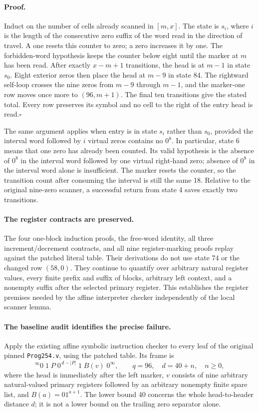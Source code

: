 \paragraph{Proof.}
Induct on the number of cells already scanned in $[m,x]$.  The state is
$s_i$, where $i$ is the length of the consecutive zero suffix of the
word read in the direction of travel.  A one resets this counter to
zero; a zero increases it by one.  The forbidden-word hypothesis keeps
the counter below eight until the marker at $m$ has been read.  After
exactly $x-m+1$ transitions, the head is at $m-1$ in state $s_0$.
Eight exterior zeros then place the head at $m-9$ in state 84.  The
rightward self-loop crosses the nine zeros from $m-9$ through $m-1$,
and the marker-one row moves once more to $(96,m+1)$.  The final ten
transitions give the stated total.  Every row preserves its symbol and
no cell to the right of the entry head is read.\hfill$\square$

The same argument applies when entry is in state $s_i$ rather than
$s_0$, provided the interval word followed by $i$ virtual zeros contains
no $0^8$.  In particular, state 6 means that one zero has already been
counted.  Its valid hypothesis is the absence of $0^8$ in the interval
word followed by one virtual right-hand zero; absence of $0^8$ in the
interval word alone is insufficient.  The marker resets the counter,
so the transition count after consuming the interval is still the
same 18.  Relative to the original nine-zero scanner, a successful
return from state 4 saves exactly two transitions.

\paragraph{The register contracts are preserved.}
The four one-block induction proofs, the free-word identity, all three
increment/decrement contracts, and all nine register-marking proofs
replay against the patched literal table.  Their derivations do not use
state 74 or the changed row $(58,0)$.  They continue to quantify over
arbitrary natural register values, every finite prefix and suffix of
blocks, arbitrary left context, and a nonempty suffix after the selected
primary register.  This establishes the register premises needed by the
affine interpreter checker independently of the local scanner lemma.

\paragraph{The baseline audit identifies the precise failure.}
Apply the existing affine symbolic instruction checker to every leaf
of the original pinned \texttt{Prog254.v}, using the patched table.
Its frame is
\[
 {}^\infty0\;1\;P\;0^{\,d-|P|}\;1\;B(v)\;0^\infty,
 \qquad q=96,\quad d=40+n,\quad n\geq0,
\]
where the head is immediately after the left marker, $v$ consists of
nine arbitrary natural-valued primary registers followed by an
arbitrary nonempty finite spare list, and $B(a)=01^{a+1}$.
The lower bound 40 concerns the whole head-to-header distance $d$;
it is not a lower bound on the trailing zero separator alone.

